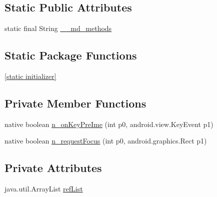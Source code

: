 \subsection*{Static Public Attributes}
\begin{CompactItemize}
\item 
static final String \hyperlink{classmd5b60ffeb829f638581ab2bb9b1a7f4f3f_1_1_forms_edit_text_2cbb395bc194ab641c62a79e13d6705f}{\_\-\_\-md\_\-methods}
\end{CompactItemize}
\subsection*{Static Package Functions}
\begin{CompactItemize}
\item 
\hyperlink{classmd5b60ffeb829f638581ab2bb9b1a7f4f3f_1_1_forms_edit_text_ebbff071dc8577936adfdc4ac285f1db}{\mbox{[}static initializer\mbox{]}}
\end{CompactItemize}
\subsection*{Private Member Functions}
\begin{CompactItemize}
\item 
native boolean \hyperlink{classmd5b60ffeb829f638581ab2bb9b1a7f4f3f_1_1_forms_edit_text_dd66e61307ce4c0dcfdbca64e20e3adc}{n\_\-onKeyPreIme} (int p0, android.view.KeyEvent p1)
\item 
native boolean \hyperlink{classmd5b60ffeb829f638581ab2bb9b1a7f4f3f_1_1_forms_edit_text_13033b8663d0fb0483a889604843bed6}{n\_\-requestFocus} (int p0, android.graphics.Rect p1)
\end{CompactItemize}
\subsection*{Private Attributes}
\begin{CompactItemize}
\item 
java.util.ArrayList \hyperlink{classmd5b60ffeb829f638581ab2bb9b1a7f4f3f_1_1_forms_edit_text_e4cf7e6b7330b3bf927c0a23059cf810}{refList}
\end{CompactItemize}


